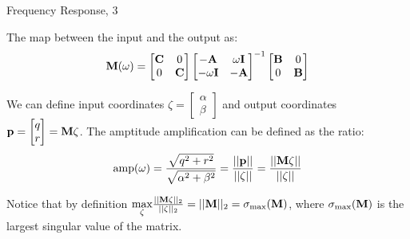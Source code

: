 \documentclass{beamer}
\begin{document}
\begin{frame}{Frequency Response, 3}
	\begin{flushleft}
		
		The map between the input and the output as:
		\begin{align}
			\mathbf{M}(\omega)
			= 
			\begin{bmatrix}
				\mathbf{C} & 0 \\  0 & \mathbf{C}
			\end{bmatrix}
			\begin{bmatrix}
				-\mathbf{A} & \omega \mathbf{I} \\
				-\omega \mathbf{I} & -\mathbf{A}
			\end{bmatrix}^{-1}
			\begin{bmatrix}
				\mathbf{B} & 0 \\  0 & \mathbf{B}
			\end{bmatrix}
		\end{align}		
		
		We can define input coordinates $\zeta = 
		\begin{bmatrix}
			\alpha \\   \beta
		\end{bmatrix}$ and output coordinates $\mathbf{p} = 
		\begin{bmatrix}
		q \\  r
		\end{bmatrix} = \mathbf{M}\zeta$. The amptitude amplification can be defined as the ratio:
		\begin{align}
			\text{amp}(\omega)
			= 
			\frac{\sqrt{q^2 + r^2}}{\sqrt{\alpha^2 + \beta^2}}
			=
			\frac{||\mathbf{p}||}{||\zeta||}
			=
			\frac{||\mathbf{M}\zeta||}{||\zeta||}
		\end{align}		
		
		Notice that by definition $\underset{\zeta}{\text{max}}\frac{||\mathbf{M}\zeta||_2}{||\zeta||_2} = ||\mathbf{M}||_2 = \sigma_{\max}(\mathbf{M})$, where $\sigma_{\max}(\mathbf{M})$ is the largest singular value of the matrix.
		
	\end{flushleft}
\end{frame}
\end{document}
